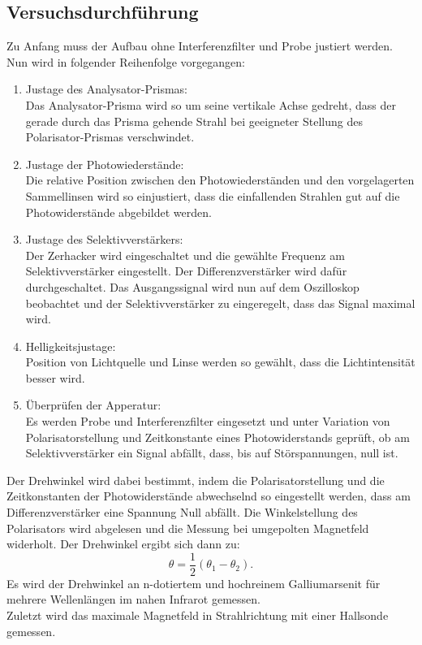 \subsection{Versuchsdurchführung}
Zu Anfang muss der Aufbau ohne Interferenzfilter und Probe justiert werden.
Nun wird in folgender Reihenfolge vorgegangen:
\begin{enumerate}
  \item Justage des Analysator-Prismas:\\
  Das Analysator-Prisma wird so um seine vertikale Achse gedreht, dass
  der gerade durch das Prisma gehende Strahl bei geeigneter Stellung des
  Polarisator-Prismas verschwindet.
  \item Justage der Photowiederstände:\\
  Die relative Position zwischen den Photowiederständen und den vorgelagerten
  Sammellinsen wird so einjustiert, dass die einfallenden Strahlen gut auf
  die Photowiderstände abgebildet werden.
  \item Justage des Selektivverstärkers:\\
  Der Zerhacker wird eingeschaltet und die gewählte Frequenz am Selektivverstärker
  eingestellt. Der Differenzverstärker wird dafür durchgeschaltet. Das Ausgangssignal wird
  nun auf dem Oszilloskop beobachtet und  der Selektivverstärker zu eingeregelt,
  dass das Signal maximal wird.
  \item Helligkeitsjustage:\\
  Position von Lichtquelle und Linse werden so gewählt, dass die Lichtintensität
  besser wird.
  \item Überprüfen der Apperatur:\\
  Es werden Probe und Interferenzfilter eingesetzt und unter Variation von
  Polarisatorstellung und Zeitkonstante eines Photowiderstands geprüft,
  ob am Selektivverstärker ein Signal abfällt, dass, bis auf Störspannungen, null ist.
\end{enumerate}
Der Drehwinkel wird dabei bestimmt, indem die Polarisatorstellung und die Zeitkonstanten der
Photowiderstände abwechselnd so eingestellt werden, dass am Differenzverstärker eine Spannung
Null abfällt. Die Winkelstellung des Polarisators wird abgelesen und die Messung
bei umgepolten Magnetfeld widerholt. Der Drehwinkel ergibt sich dann zu:
\begin{equation}
  \theta = \frac{1}{2} \left(\theta_1 - \theta_2 \right).
  \label{runederaffe}
\end{equation}
Es wird der Drehwinkel an n-dotiertem und hochreinem Galliumarsenit für mehrere Wellenlängen
im nahen Infrarot gemessen.\\
Zuletzt wird das maximale Magnetfeld in Strahlrichtung mit einer Hallsonde gemessen.
